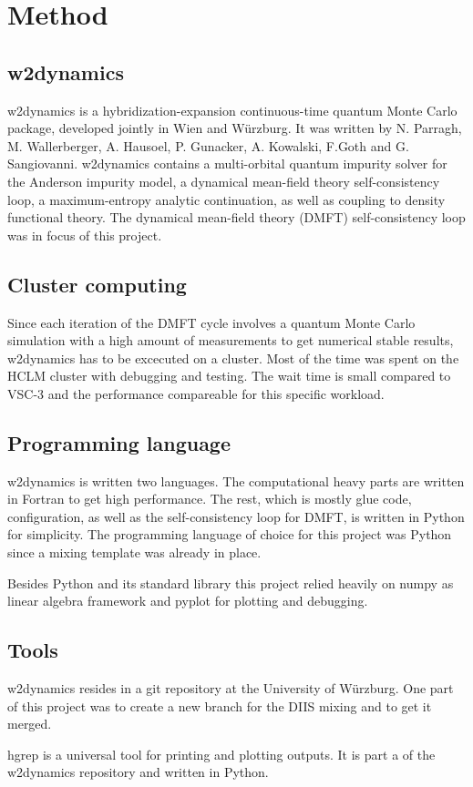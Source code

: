 \chapter{Method}
\label{ch:method}

\section{w2dynamics}

w2dynamics\cite{w2dyn} is a hybridization-expansion continuous-time quantum Monte Carlo package, developed jointly in Wien and Würzburg. It was written by N. Parragh, M. Wallerberger, A. Hausoel, P. Gunacker, A. Kowalski, F.Goth and G. Sangiovanni. w2dynamics contains a multi-orbital quantum impurity solver for the Anderson impurity model, a dynamical mean-field theory self-consistency loop, a maximum-entropy analytic continuation, as well as coupling to density functional theory. The dynamical mean-field theory (DMFT) self-consistency loop was in focus of this project.

\section{Cluster computing}

Since each iteration of the DMFT cycle involves a quantum Monte Carlo simulation with a high amount of measurements to get numerical stable results, w2dynamics has to be excecuted on a cluster. Most of the time was spent on the HCLM cluster with debugging and testing. The wait time is small compared to VSC-3 and the performance compareable for this specific workload.

\section{Programming language}

w2dynamics is written two languages. The computational heavy parts are written in Fortran to get high performance. The rest, which is mostly glue code, configuration, as well as the self-consistency loop for DMFT, is written in Python for simplicity. The programming language of choice for this project was Python since a mixing template was already in place.

Besides Python and its standard library this project relied heavily on numpy as linear algebra framework and pyplot for plotting and debugging.

\section{Tools}

w2dynamics resides in a git repository at the University of Würzburg. One part of this project was to create a new branch for the DIIS mixing and to get it merged.

hgrep is a universal tool for printing and plotting outputs. It is part a of the w2dynamics repository and written in Python.

